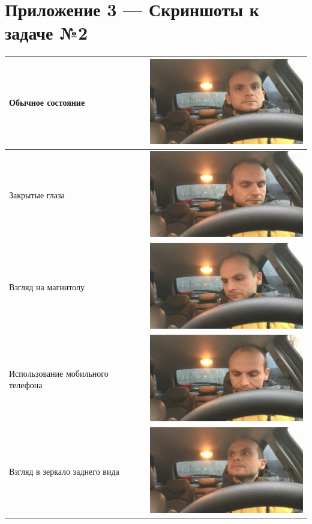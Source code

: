 \section*{Приложение 3 — Скриншоты к задаче №2}

\begin{tabular}{|l|l|}
    \hline
    Обычное состояние & \includegraphics[width=7cm]{1.png} \\
    \hline
    Закрытые глаза & \includegraphics[width=7cm]{2.png} \\
    \hline
    Взгляд на магнитолу & \includegraphics[width=7cm]{3.png} \\
    \hline
    Использование мобильного телефона & \includegraphics[width=7cm]{4.png} \\
    \hline
    Взгляд в зеркало заднего вида & \includegraphics[width=7cm]{5.png} \\

\end{tabular}
